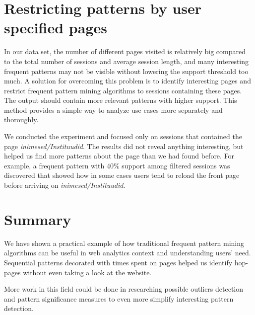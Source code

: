 \documentclass[12pt, english,a4paper]{article}
\begin{document}
\section{Restricting patterns by user specified pages}
In our data set, the number of different pages visited is relatively big compared to the total number of sessions and average session length, and many interesting frequent patterns may not be visible without lowering the support threshold too much. A solution for overcoming this problem is to identify interesting pages and restrict frequent pattern mining algorithms to sessions containing these pages. The output should contain more relevant patterns with higher support. This method provides a simple way to analyze use cases more separately and thoroughly.

We conducted the experiment and focused only on sessions that contained the page \emph{inimesed/Instituudid}. The results did not reveal anything interesting, but helped us find more patterns about the page than we had found before. For example, a frequent pattern with $40\%$ support among filtered sessions was discovered that showed how in some cases users tend to reload the front page before arriving on \emph{inimesed/Instituudid}.

\section{Summary}
We have shown a practical example of how traditional frequent pattern mining algorithms can be useful in web analytics context and understanding users' need. Sequential patterns decorated with times spent on pages helped us identify hop-pages without even taking a look at the website.

More work in this field could be done in researching possible outliers detection and pattern significance measures to even more simplify interesting pattern detection.













\end{document}
